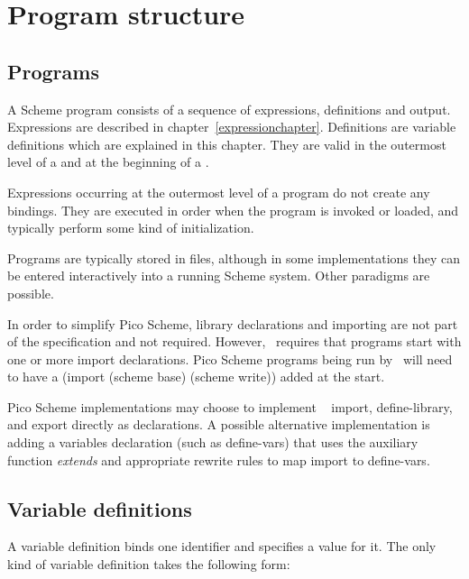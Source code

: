 \chapter{Program structure}
\label{programchapter}

\section{Programs}

A Scheme program consists of a sequence of
expressions, definitions and output.
Expressions are described in chapter~\ref{expressionchapter}.
Definitions are variable definitions which are explained in this chapter.
They are valid in the outermost level of a 
and at the beginning of a .

Expressions occurring at the outermost level of a program
do not create any bindings.  They are
executed in order when the program is
invoked or loaded, and typically perform some kind of initialization.

Programs are typically stored in files, although
in some implementations they can be entered interactively into a running
Scheme system.  Other paradigms are possible.

\begin{note}
  In order to simplify Pico Scheme, library declarations and importing
  are not part of the specification and not required.  However,
  \rsevenrs\ requires that programs start with one or more import
  declarations. Pico Scheme programs being run by \rsevenrs\ will need
  to have a {\cf (import (scheme base) (scheme write))} added at the
  start.

  Pico Scheme implementations may choose to implement \rsevenrs\ {\cf
    import}, {\cf define-library}, and {\cf export} directly as
  declarations.  A possible alternative implementation is adding a
  variables declaration (such as {\cf define-vars}) that uses the
  auxiliary function {\it extends} and appropriate rewrite rules to
  map {\cf import} to {\cf define-vars}.
\end{note}

\section{Variable definitions}
\label{defines}

A variable definition binds one identifier and specifies a
value for it.
The only kind of variable definition
takes the following form:

